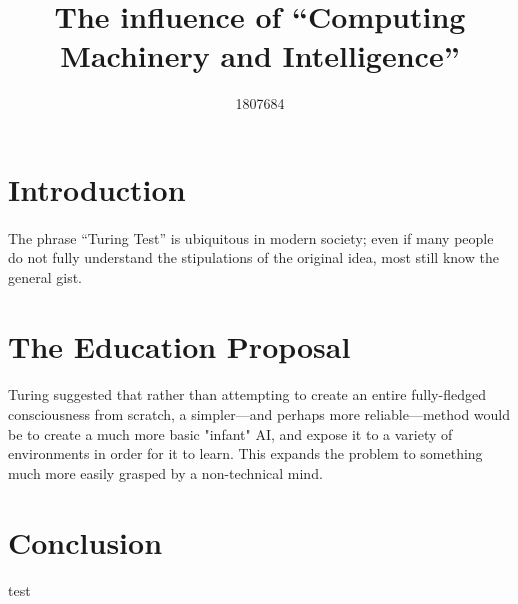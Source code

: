 \documentclass{scrartcl}
\title{The influence of “Computing Machinery and Intelligence”}
\author{1807684}
\begin{document}
\maketitle

\section{Introduction}
\paragraph{}
The phrase “Turing Test” is ubiquitous in modern society; even if many people do not fully understand the stipulations of the original idea, most still know the general gist.

\section{The Education Proposal}
\paragraph{}  %
Turing suggested that rather than attempting to create an entire fully-fledged consciousness from scratch, a simpler—and perhaps more reliable—method would be to create a much more basic "infant" AI, and expose it to a variety of environments in order for it to learn. This expands the problem to something much more easily grasped by a non-technical mind.\cite{Infants}

\section{Conclusion}
\paragraph{}
test \cite{Main}



\end{document}
